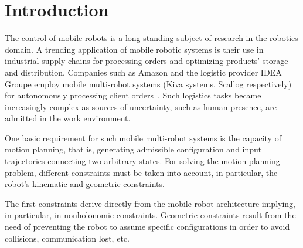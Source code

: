 \documentclass[eprint]{actapoly}
\begin{document}
\section{Introduction}\label{sec:intro}






The %
control of mobile robots is a long-standing subject of research 
in the robotics domain. A trending application of mobile robotic systems
is their use in industrial supply-chains for processing orders and optimizing products' storage and distribution. Companies such as Amazon and the logistic provider IDEA Groupe employ mobile multi-robot systems (Kiva systems, Scallog respectively) for autonomously processing client orders~\cite{Gizmag,supplychain}.
Such logistics tasks became increasingly complex as sources of uncertainty, such as human presence, are admitted in the work environment.


One basic requirement for such mobile multi-robot systems is the capacity of motion planning, that is, generating admissible configuration and input trajectories connecting two arbitrary states. For solving the motion planning problem, different 
constraints must be taken into account, in particular, the robot's kinematic and geometric constraints.
%
%
%



The first constraints derive directly from the mobile robot architecture 
implying, in particular, in nonholonomic constraints.
Geometric constraints result from the need of preventing the robot to assume
specific configurations
in order to avoid collisions, communication lost, etc.
\end{document}
